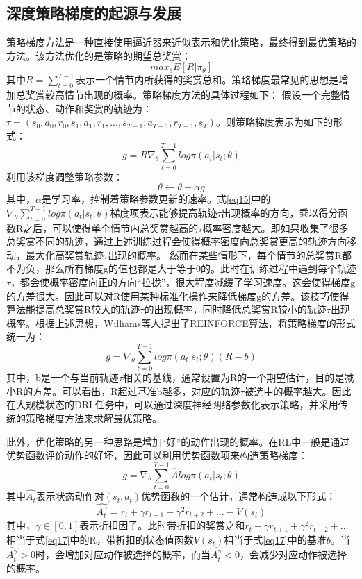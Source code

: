 \documentclass[bachelor]{thesis-uestc}
\begin{document}
	\subsection{深度策略梯度的起源与发展}\label{sec2}
	策略梯度方法是一种直接使用逼近器来近似表示和优化策略，最终得到最优策略的方法。该方法优化的是策略的期望总奖赏：
	\begin{equation}
		\label{eq14}
		max_{\theta}E[R|\pi_\theta]
	\end{equation}
	其中$R=\sum_{t=0}^{T-1}$表示一个情节内所获得的奖赏总和。策略梯度最常见的思想是增加总奖赏较高情节出现的概率。策略梯度方法的具体过程如下：
	假设一个完整情节的状态、动作和奖赏的轨迹为：$\tau=(s_0,a_0,r_0,s_1,a_1,r_1,...,s_{T-1},a_{T-1},r_{T-1},s_T)$。则策略梯度表示为如下的形式：
	\begin{equation}
		\label{eq15}
		g=R\nabla_\theta\sum_{t=0}^{T-1}log\pi(a_t|s_t;\theta)
	\end{equation}
	利用该梯度调整策略参数：
	\begin{equation}
		\label{eq16}
		\theta\leftarrow\theta+\alpha g
	\end{equation}
	其中，$\alpha$是学习率，控制着策略参数更新的速率。式\ref{eq15}中的$\nabla_\theta\sum_{t=0}^{T-1}log\pi(a_t|s_t;\theta)$梯度项表示能够提高轨迹$\tau$出现概率的方向，乘以得分函数R之后，可以使得单个情节内总奖赏越高的$\tau$概率密度越大。即如果收集了很多总奖赏不同的轨迹，通过上述训练过程会使得概率密度向总奖赏更高的轨迹方向移动，最大化高奖赏轨迹$\tau$出现的概率。
	然而在某些情形下，每个情节的总奖赏R都不为负，那么所有梯度g的值也都是大于等于0的。此时在训练过程中遇到每个轨迹$\tau$，都会使概率密度向正的方向“拉拢”，很大程度减缓了学习速度。这会使得梯度g的方差很大。因此可以对R使用某种标准化操作来降低梯度g的方差。该技巧使得算法能提高总奖赏R较大的轨迹$\tau$的出现概率，同时降低总奖赏R较小的轨迹$\tau$出现概率。根据上述思想，Williams等人提出了REINFORCE算法，将策略梯度的形式统一为：
	\begin{equation}
		\label{eq17}
		g=\nabla_\theta\sum_{t=0}^{T-1}log\pi(a_t|s_t;\theta)(R-b)
	\end{equation}
	其中，b是一个与当前轨迹$\tau$相关的基线，通常设置为R的一个期望估计，目的是减小R的方差。可以看出，R超过基准b越多，对应的轨迹$\tau$被选中的概率越大。因此在大规模状态的DRL任务中，可以通过深度神经网络参数化表示策略，并采用传统的策略梯度方法来求解最优策略。
	
	此外，优化策略的另一种思路是增加“好”的动作出现的概率。在RL中一般是通过优势函数评价动作的好坏，因此可以利用优势函数项来构造策略梯度：
	\begin{equation}
		\label{eq18}
		g=\nabla_\theta\sum_{t=0}^{T-1}\hat{A}log\pi(a_t|s_t;\theta)
	\end{equation}
	其中$\hat{A_t}$表示状态动作对$(s_t,a_t)$优势函数的一个估计，通常构造成以下形式：
	\begin{equation}
		\label{eq19}
		\hat{A_t^\gamma}=r_t+\gamma r_{t+1}+\gamma^2 r_{t+2}+\dots-V(s_t)
	\end{equation}
	其中，$\gamma\in[0,1]$表示折扣因子。此时带折扣的奖赏之和$r_t+\gamma r_{t+1}+\gamma^2 r_{t+2}+\dots$相当于式\ref{eq17}中的R，带折扣的状态值函数$V(s_t)$相当于式\ref{eq17}中的基准$b$。当$\hat{A_t^\gamma}>0$时，会增加对应动作被选择的概率，而当$\hat{A_t^\gamma}<0$，会减少对应动作被选择的概率。
	
\end{document}
